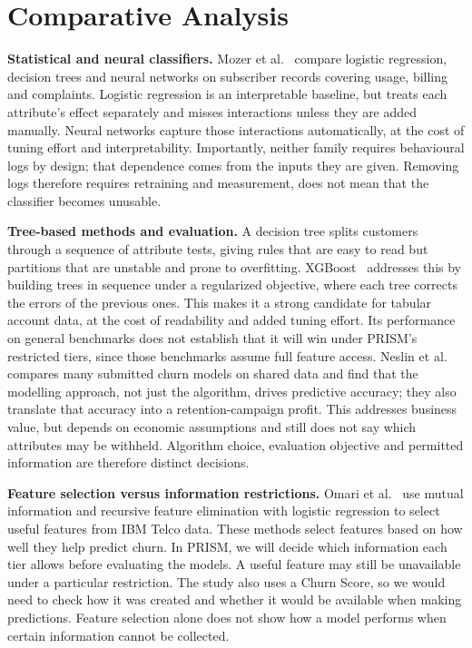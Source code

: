 \documentclass[sigconf,nonacm]{acmart}
\begin{document}
\section{Comparative Analysis}
\textbf{Statistical and neural classifiers.} Mozer et al.~\cite{mozer} compare logistic regression, decision trees and neural networks on subscriber records covering usage, billing and complaints. Logistic regression is an interpretable baseline, but treats each attribute’s effect separately and misses interactions unless they are added manually. Neural networks capture those interactions automatically, at the cost of tuning effort and interpretability. Importantly, neither family requires behavioural logs by design; that dependence comes from the inputs they are given. Removing logs therefore requires retraining and measurement, does not mean that the classifier becomes unusable.

\textbf{Tree-based methods and evaluation.} A decision tree splits customers through a sequence of attribute tests, giving rules that are easy to read but partitions that are unstable and prone to overfitting. XGBoost~\cite{xgboost} addresses this by building trees in sequence under a regularized objective, where each tree corrects the errors of the previous ones. This makes it a strong candidate for tabular account data, at the cost of readability and added tuning effort. Its performance on general benchmarks does not establish that it will win under PRISM’s restricted tiers, since those benchmarks assume full feature access. Neslin et al.~\cite{neslin} compares many submitted churn models on shared data and find that the modelling approach, not just the algorithm, drives predictive accuracy; they also translate that accuracy into a retention-campaign profit. This addresses business value, but depends on economic assumptions and still does not say which attributes may be withheld. Algorithm choice, evaluation objective and permitted information are therefore distinct decisions.

\textbf{Feature selection versus information restrictions.}
Omari et al.~\cite{omari} use mutual information and recursive feature elimination with logistic regression to select useful features from IBM Telco data. These methods select features based on how well they help predict churn. In PRISM, we will decide which information each tier allows before evaluating the models. A useful feature may still be unavailable under a particular restriction. The study also uses a Churn Score, so we would need to check how it was created and whether it would be available when making predictions. Feature selection alone does not show how a model performs when certain information cannot be collected.
\end{document}
